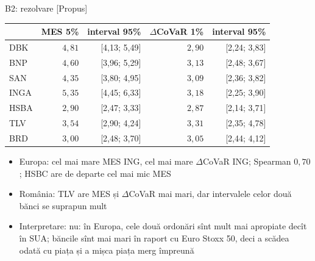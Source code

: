 \ifsolutions
\begin{frame}{B2: rezolvare [Propus]}
\itemsize{\footnotesize}
\begin{center}
\scriptsize
\begin{tabular}{lrrrr}
\toprule
& MES 5\% & interval 95\% & $\Delta$CoVaR 1\% & interval 95\% \\
\midrule
DBK & $4{,}81$ & [4{,}13; 5{,}49] & $2{,}90$ & [2{,}24; 3{,}83] \\
BNP & $4{,}60$ & [3{,}96; 5{,}29] & $3{,}13$ & [2{,}48; 3{,}67] \\
SAN & $4{,}35$ & [3{,}80; 4{,}95] & $3{,}09$ & [2{,}36; 3{,}82] \\
INGA & $5{,}35$ & [4{,}45; 6{,}33] & $3{,}18$ & [2{,}25; 3{,}90] \\
HSBA & $2{,}90$ & [2{,}47; 3{,}33] & $2{,}87$ & [2{,}14; 3{,}71] \\
\midrule
TLV & $3{,}54$ & [2{,}90; 4{,}24] & $3{,}31$ & [2{,}35; 4{,}78] \\
BRD & $3{,}00$ & [2{,}48; 3{,}70] & $3{,}05$ & [2{,}44; 4{,}12] \\
\bottomrule
\end{tabular}
\end{center}
\begin{itemize}
    \item Europa: cel mai mare MES ING, cel mai mare $\Delta$CoVaR ING; Spearman $0{,}70$; HSBC are de departe cel mai mic MES
    \item România: TLV are MES și $\Delta$CoVaR mai mari, dar intervalele celor două bănci se suprapun mult
    \item Interpretare: nu: în Europa, cele două ordonări sînt mult mai apropiate decît în SUA; băncile sînt mai mari în raport cu Euro Stoxx 50, deci a scădea odată cu piața și a mișca piața merg împreună
\end{itemize}
\end{frame}
\fi

